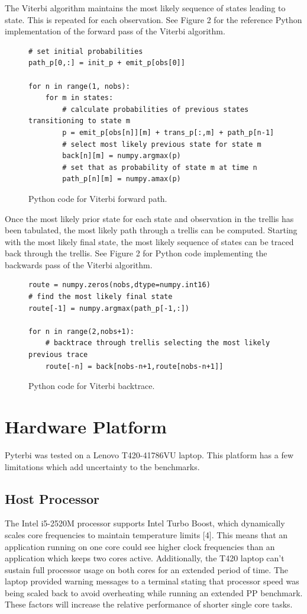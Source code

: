 \documentclass[journal,onecolumn]{IEEEtran}
\begin{document}
The Viterbi algorithm maintains the most likely sequence of states leading to state. This is repeated for each observation. See Figure 2 for the reference Python implementation of the forward pass of the Viterbi algorithm.
\begin{figure}[h!]
\begin{lstlisting}
# set initial probabilities
path_p[0,:] = init_p + emit_p[obs[0]]

for n in range(1, nobs):
    for m in states:
        # calculate probabilities of previous states transitioning to state m    
        p = emit_p[obs[n]][m] + trans_p[:,m] + path_p[n-1]
        # select most likely previous state for state m
        back[n][m] = numpy.argmax(p)
        # set that as probability of state m at time n 
        path_p[n][m] = numpy.amax(p)
\end{lstlisting}
    \label{fig:forcode}
    \caption{Python code for Viterbi forward path.}
\end{figure} 

Once the most likely prior state for each state and observation in the trellis has been tabulated, the most likely path through a trellis can be computed. Starting with the most likely final state, the most likely sequence of states can be traced back through the trellis. See Figure 2 for Python code implementing the backwards pass of the Viterbi algorithm. 
\begin{figure}[h!]
\begin{lstlisting}
route = numpy.zeros(nobs,dtype=numpy.int16)
# find the most likely final state
route[-1] = numpy.argmax(path_p[-1,:])

for n in range(2,nobs+1):
    # backtrace through trellis selecting the most likely previous trace
    route[-n] = back[nobs-n+1,route[nobs-n+1]]
\end{lstlisting}
    \label{fig:backcode}
    \caption{Python code for Viterbi backtrace.}
\end{figure}

\section{Hardware Platform}
Pyterbi was tested on a Lenovo T420-41786VU laptop. This platform has a few limitations which add uncertainty to the benchmarks. 

\subsection{Host Processor}
The Intel i5-2520M processor supports Intel Turbo Boost, which dynamically scales core frequencies to maintain temperature limits [4]. This means that an application running on one core could see higher clock frequencies than an application which keeps two cores active. Additionally, the T420 laptop can't sustain full processor usage on both cores for an extended period of time. The laptop provided warning messages to a terminal stating that processor speed was being scaled back to avoid overheating while running an extended PP benchmark. These factors will increase the relative performance of shorter single core tasks.  
\end{document}

